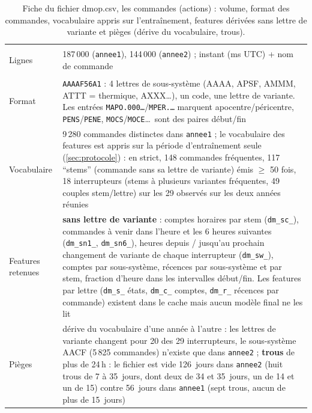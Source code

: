 \documentclass[11pt,a4paper]{article}
\begin{document}
\begin{table}[htbp]
\centering\small
\caption{Fiche du fichier dmop.csv, les commandes (actions) : volume, format des commandes, vocabulaire appris sur l'entraînement, features dérivées sans lettre de variante et pièges (dérive du vocabulaire, trous).}
\label{tab:dmop}
\begin{tabularx}{\textwidth}{>{\bfseries\raggedright\arraybackslash}p{3.1cm} Y}
\toprule
Lignes & 187\,000 (\texttt{annee1}), 144\,000 (\texttt{annee2}) ; instant (ms UTC) + nom de commande \\
Format & \texttt{AAAAF56A1} : 4 lettres de sous-système (AAAA, APSF, AMMM, ATTT = thermique, AXXX\ldots), un code, une lettre de variante. Les entrées \texttt{MAPO.000\ldots}/\texttt{MPER.\ldots} marquent apocentre/péricentre, \texttt{PENS}/\texttt{PENE}, \texttt{MOCS}/\texttt{MOCE}\ldots\ sont des paires début/fin \\
Vocabulaire & 9\,280 commandes distinctes dans \texttt{annee1} ; le vocabulaire des features est appris sur la période d'entraînement seule (\autoref{sec:protocole}) : en strict, 148 commandes fréquentes, 117 \enquote{stems} (commande sans sa lettre de variante) émis $\geq$ 50 fois, 18 interrupteurs (stems à plusieurs variantes fréquentes, 49 couples stem/lettre) sur les 29 observés sur les deux années réunies \\
Features retenues & \textbf{sans lettre de variante} : comptes horaires par stem (\texttt{dm\_sc\_}), commandes à venir dans l'heure et les 6 heures suivantes (\texttt{dm\_sn1\_}, \texttt{dm\_sn6\_}), heures depuis / jusqu'au prochain changement de variante de chaque interrupteur (\texttt{dm\_sw\_}), comptes par sous-système, récences par sous-système et par stem, fraction d'heure dans les intervalles début/fin. Les features par lettre (\texttt{dm\_s\_} états, \texttt{dm\_c\_} comptes, \texttt{dm\_r\_} récences par commande) existent dans le cache mais aucun modèle final ne les lit \\
Pièges & dérive du vocabulaire d'une année à l'autre : les lettres de variante changent pour 20 des 29 interrupteurs, le sous-système AACF (5\,825 commandes) n'existe que dans \texttt{annee2} ; \textbf{trous} de plus de 24\,h : le fichier est vide 126~jours dans \texttt{annee2} (huit trous de 7 à 35~jours, dont deux de 34 et 35~jours, un de 14 et un de 15) contre 56~jours dans \texttt{annee1} (sept trous, aucun de plus de 15~jours) \\
\bottomrule
\end{tabularx}
\end{table}
\end{document}

